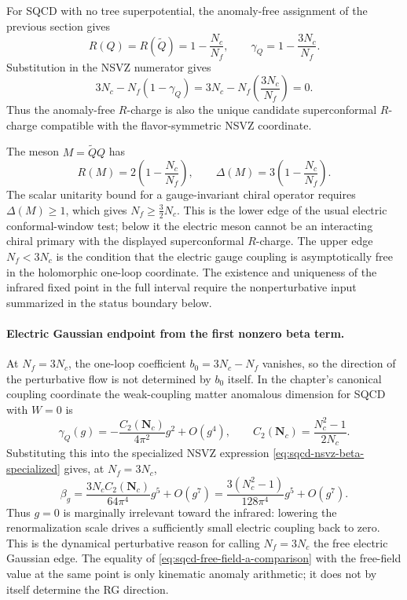 For SQCD with no tree superpotential, the anomaly-free assignment of the
previous section gives
\[
  R(Q)=R(\widetilde Q)=1-\frac{N_c}{N_f},
  \qquad
  \gamma_Q=1-\frac{3N_c}{N_f}.
\]
Substitution in the NSVZ numerator gives
\[
  3N_c-N_f(1-\gamma_Q)
  =
  3N_c-N_f\left(\frac{3N_c}{N_f}\right)
  =
  0 .
\]
Thus the anomaly-free \(R\)-charge is also the unique candidate
superconformal \(R\)-charge compatible with the flavor-symmetric NSVZ
coordinate.

The meson \(M=\widetilde Q Q\) has
\[
  R(M)=2\left(1-\frac{N_c}{N_f}\right),
  \qquad
  \Delta(M)=3\left(1-\frac{N_c}{N_f}\right).
\]
The scalar unitarity bound for a gauge-invariant chiral operator requires
\(\Delta(M)\geq1\), which gives \(N_f\geq\frac32N_c\).  This is the lower
edge of the usual electric conformal-window test; below it the electric
meson cannot be an interacting chiral primary with the displayed
superconformal \(R\)-charge.  The upper edge \(N_f<3N_c\) is the condition
that the electric gauge coupling is asymptotically free in the holomorphic
one-loop coordinate.  The existence and uniqueness of the infrared fixed
point in the full interval require the nonperturbative input summarized in
the status boundary below.

\paragraph{Electric Gaussian endpoint from the first nonzero beta term.}
At \(N_f=3N_c\), the one-loop coefficient \(b_0=3N_c-N_f\) vanishes, so the
direction of the perturbative flow is not determined by \(b_0\) itself.  In
the chapter's canonical coupling coordinate the weak-coupling matter
anomalous dimension for SQCD with \(W=0\) is
\begin{equation}
  \gamma_Q(g)
  =
  -\frac{C_2(\mathbf N_c)}{4\pi^2}g^2+O(g^4),
  \qquad
  C_2(\mathbf N_c)=\frac{N_c^2-1}{2N_c}.
  \label{eq:sqcd-one-loop-quark-gamma}
\end{equation}
Substituting this into the specialized NSVZ expression
\eqref{eq:sqcd-nsvz-beta-specialized} gives, at \(N_f=3N_c\),
\begin{equation}
  \beta_g
  =
  \frac{3N_cC_2(\mathbf N_c)}{64\pi^4}g^5+O(g^7)
  =
  \frac{3(N_c^2-1)}{128\pi^4}g^5+O(g^7).
  \label{eq:sqcd-electric-gaussian-edge-beta}
\end{equation}
Thus \(g=0\) is marginally irrelevant toward the infrared: lowering the
renormalization scale drives a sufficiently small electric coupling back to
zero.  This is the dynamical perturbative reason for calling \(N_f=3N_c\)
the free electric Gaussian edge.  The equality of
\eqref{eq:sqcd-free-field-a-comparison} with the free-field value at the same
point is only kinematic anomaly arithmetic; it does not by itself determine
the RG direction.

